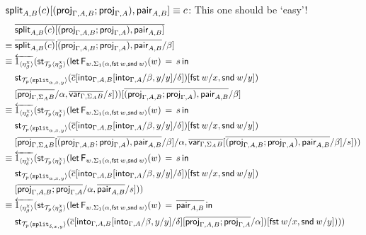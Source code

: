 \documentclass[10pt]{article}
\theoremstyle{definition}
\newcommand\dsd[1]{\ensuremath{\mathsf{#1}}}
\newcommand{\app}[2]{\ensuremath{#1 \: #2}}
\newcommand{\fst}[1]{\app{\dsd{fst}}{#1}}
\newcommand{\snd}[1]{\app{\dsd{snd}}{#1}}
\newcommand{\rewrite}[2]{\overleftarrow{#1}(#2)}
\newcommand\StI[2]{\ensuremath{\mathsf{st}_{#1}(#2)}}
\newcommand\FEs[4]{\ensuremath{\mathsf{let} \, \mathsf{F}_{#1}(#3) \, = \, {#2} \, \mathsf{in} \, #4}}
\newcommand\ApEl[2]{\mathcal{T}_{#1}\langle#2\rangle}
\begin{document}
\begin{enumerate}[style = multiline, labelwidth = 80pt]
\item[{$\mathsf{split}_{A,B}(c)\allowbreak[(\mathsf{proj}_{\Gamma, A, B};\mathsf{proj}_{\Gamma, A}), \allowbreak\mathsf{pair}_{A,B}] \equiv c$}:] 
This one should be `easy'!
\begin{align*}
&\upstairs{\qsplit{A,B}(c)[(\proj{\Gamma, A, B};\proj{\Gamma, A}),\qpair{A,B}]} \\
\equiv{} &\upstairs{\qsplit{A,B}(c)}[\upstairs{(\proj{\Gamma, A, B};\proj{\Gamma, A}),\qpair{A,B}}/\beta] \\
\equiv{} &\rewrite{1_{\langle \eta^\chi_\beta \rangle}}{\StI{\ApEl{p}{\eta^\chi_\beta}}{\FEs{w. \Sigma_1(\alpha,\fst w, \snd w)}{s}{w}{\\&\StI{\ApEl{p}{\tsplit{\alpha,x,y}}}{\upstairs{c}[\into{\Gamma, A, B}[\into{\Gamma, A}/\beta, y/y] /\delta]}[\fst w/x, \snd w/y]})\\&[\upstairs{\proj{\Gamma, \Sigma_A B}}/\alpha, \upstairs{\var{\Gamma, \Sigma_A B}}/s]}}[\upstairs{(\proj{\Gamma, A, B};\proj{\Gamma, A}),\qpair{A,B}}/\beta] \\
\equiv{} &\rewrite{1_{\langle \eta^\chi_\delta \rangle}}{\StI{\ApEl{p}{\eta^\chi_\delta}}{\FEs{w. \Sigma_1(\alpha,\fst w, \snd w)}{s}{w}{\\&\StI{\ApEl{p}{\tsplit{\alpha,x,y}}}{\upstairs{c}[\into{\Gamma, A, B}[\into{\Gamma, A}/\beta, y/y] /\delta]}[\fst w/x, \snd w/y]})\\&[\upstairs{\proj{\Gamma, \Sigma_A B}}[\upstairs{(\proj{\Gamma, A, B};\proj{\Gamma, A}),\qpair{A,B}}/\beta]/\alpha, \upstairs{\var{\Gamma, \Sigma_A B}}[\upstairs{(\proj{\Gamma, A, B};\proj{\Gamma, A}),\qpair{A,B}}/\beta]/s]}} \\
\equiv{} &\rewrite{1_{\langle \eta^\chi_\delta \rangle}}{\StI{\ApEl{p}{\eta^\chi_\delta}}{\FEs{w. \Sigma_1(\alpha,\fst w, \snd w)}{s}{w}{\\&\StI{\ApEl{p}{\tsplit{\alpha,x,y}}}{\upstairs{c}[\into{\Gamma, A, B}[\into{\Gamma, A}/\beta, y/y] /\delta]}[\fst w/x, \snd w/y]})\\&[\upstairs{\proj{\Gamma, A, B};\proj{\Gamma, A}}/\alpha, \upstairs{\qpair{A,B}}/s]}} \\
\equiv{} &\rewrite{1_{\langle \eta^\chi_\beta \rangle}}{\StI{\ApEl{p}{\eta^\chi_\beta}}{\FEs{w. \Sigma_1(\alpha,\fst w, \snd w)}{\upstairs{\qpair{A,B}}}{w}{\\&\StI{\ApEl{p}{\tsplit{\delta,x,y}}}{\upstairs{c}[\into{\Gamma, A, B}[\into{\Gamma, A}/\beta, y/y] /\delta][\upstairs{\proj{\Gamma, A, B};\proj{\Gamma, A}}/\alpha]}[\fst w/x, \snd w/y]})}} \\

\end{align*}
\end{enumerate}
\end{document}
